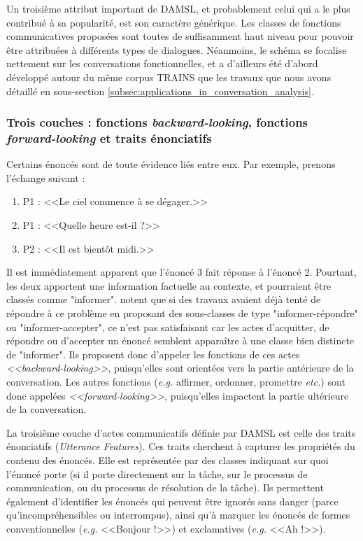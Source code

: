 \documentclass[10pt,a4paper,twoside]{article}
\begin{document}
Un troisième attribut important de DAMSL, et probablement celui qui a le plus contribué à sa popularité, est son caractère générique. Les classes de fonctions communicatives proposées sont toutes de suffisamment haut niveau pour pouvoir être attribuées à différents types de dialogues. Néanmoins, le schéma se focalise nettement sur les conversations fonctionnelles, et a d'ailleurs été d'abord développé autour du même corpus TRAINS que les travaux que nous avons détaillé en sous-section \ref{subsec:applications_in_conversation_analysis}.

\subsubsection{Trois couches : fonctions \textit{backward-looking}, fonctions \textit{forward-looking} et traits énonciatifs}

Certains énoncés sont de toute évidence liés entre eux. Par exemple, prenons l'échange suivant :

\begin{enumerate}
	\item P1 : <<Le ciel commence à se dégager.>>
	\item P1 : <<Quelle heure est-il ?>>
	\item P2 : <<Il est bientôt midi.>>
\end{enumerate}

Il est immédiatement apparent que l'énoncé 3 fait réponse à l'énoncé 2. Pourtant, les deux apportent une information factuelle au contexte, et pourraient être classés comme "informer". \citeauthor{core1997coding} notent que si des travaux avaient déjà tenté de répondre à ce problème en proposant des sous-classes de type "informer-répondre" ou "informer-accepter", ce n'est pas satisfaisant car les actes d'acquitter, de répondre ou d'accepter un énoncé semblent apparaître à une classe bien distincte de "informer". Ils proposent donc d'appeler les fonctions de ces actes \textit{<<backward-looking>>}, puisqu'elles sont orientées vers la partie antérieure de la conversation. Les autres fonctions (\textit{e.g.} affirmer, ordonner, promettre \textit{etc.}) sont donc appelées \textit{<<forward-looking>>}, puisqu'elles impactent la partie ultérieure de la conversation.

La troisième couche d'actes communicatifs définie par DAMSL est celle des traits énonciatifs (\textit{Utterance Features}). Ces traits cherchent à capturer les propriétés du contenu des énoncés. Elle est représentée par des classes indiquant sur quoi l'énoncé porte (si il porte directement sur la tâche, sur le processus de communication, ou du processus de résolution de la tâche). Ils permettent également d'identifier les énoncés qui peuvent être ignorés sans danger (parce qu'incompréhensibles ou interrompus), ainsi qu'à marquer les énoncés de formes conventionnelles (\textit{e.g.} <<Bonjour !>>) et exclamatives (\textit{e.g.} <<Ah !>>).
\end{document}

